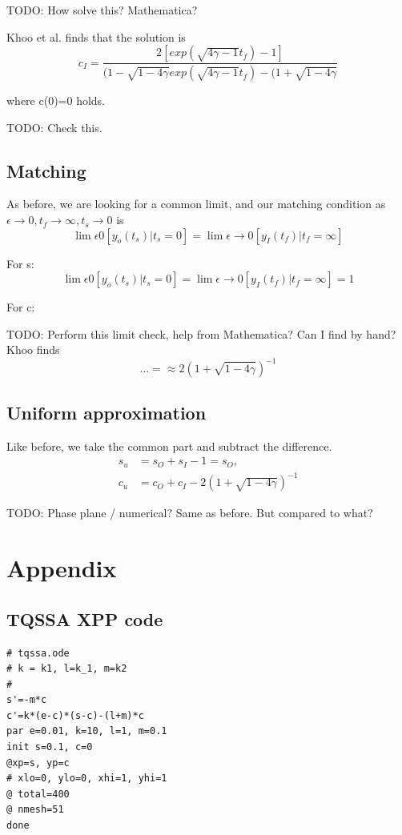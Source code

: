 \documentclass[12pt]{article}
\begin{document}
TODO: How solve this? Mathematica?

Khoo et al. finds that the solution is
\begin{equation}
c_I = \frac{2[exp(\sqrt{4\gamma-1}t_f)-1]}{(1-\sqrt{1-4\gamma}
exp(\sqrt{4\gamma-1}t_f) - (1+\sqrt{1-4\gamma}}
\end{equation}

where c(0)=0 holds.

TODO: Check this.

\subsection{Matching}

As before, we are looking for a common limit, and our matching condition as
$\epsilon \to 0, t_f \to \infty, t_s \to 0$ is
\begin{equation}
\lim \epsilon 0 [y_o(t_s)|t_s=0] = \lim \epsilon \to 0[y_I(t_f)|t_f=\infty]
\end{equation}

For s:
\begin{equation}
\lim \epsilon 0 [y_o(t_s)|t_s=0] = \lim \epsilon \to 0[y_I(t_f)|t_f=\infty] = 1
\end{equation}

For c:

TODO: Perform this limit check, help from Mathematica? Can I find by hand? Khoo
finds
\begin{equation}
... = \approx 2(1+\sqrt{1-4\gamma})^{-1}
\end{equation}

\subsection{Uniform approximation}

Like before, we take the common part and subtract the difference.
\begin{align}
s_u &= s_O + s_I - 1 = s_O, \\
c_u &= c_O + c_I - 2(1 + \sqrt{1-4\gamma})^{-1}
\end{align}

TODO: Phase plane / numerical? Same as before. But compared to what?

\section{Appendix}

\subsection{TQSSA XPP code}
\begin{verbatim}
# tqssa.ode
# k = k1, l=k_1, m=k2
#
s'=-m*c
c'=k*(e-c)*(s-c)-(l+m)*c
par e=0.01, k=10, l=1, m=0.1
init s=0.1, c=0
@xp=s, yp=c
# xlo=0, ylo=0, xhi=1, yhi=1
@ total=400
@ nmesh=51
done
\end{verbatim}
\end{document}
